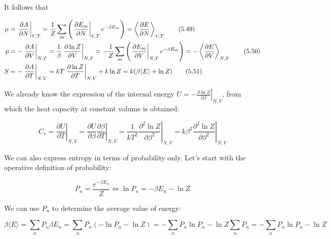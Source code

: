 \documentclass[12pt,a4paper]{report}
\newcommand{\esp}{\vspace{0.5cm}}
\begin{document}
\esp

It follows that

\esp

\begin{align}
	\mu &= \left. \frac{\partial A}{\partial N} \right|_{V,T} = \frac{1}{Z} \sum_{m} \left( \left. \frac{\partial E_m}{\partial N} \right|_{V,T} e^{-\beta E_m} \right) = \left\langle \frac{\partial E}{\partial N} \right\rangle_{V,T} \tag{5.49} \\
	\esp
	p &= -\left. \frac{\partial A}{\partial V} \right|_{N,T} = \frac{1}{\beta} \left. \frac{\partial \ln Z}{\partial V} \right|_{N,T} = -\frac{1}{Z} \sum_{m} \left( \left. \frac{\partial E_m}{\partial V} \right|_{N,T} e^{-\beta E_m} \right) = -\left\langle \frac{\partial E}{\partial V} \right\rangle_{N,T} \tag{5.50} \\
	\esp
	S &= -\left. \frac{\partial A}{\partial T} \right|_{N,V} = kT \left. \frac{\partial \ln Z}{\partial T} \right|_{N,V} + k \ln Z = k(\beta \langle E \rangle + \ln Z) \tag{5.51}
\end{align}

\esp

We already know the expression of the internal energy $U = -\left. \frac{\partial \ln Z}{\partial \beta} \right|_{N,V}$, from which the heat capacity at constant volume is obtained:

\esp

\begin{equation}
	C_v = \left. \frac{\partial U}{\partial T} \right|_{N,V} = \left. \frac{\partial U}{\partial \beta} \frac{\partial \beta}{\partial T} \right|_{N,V} = \frac{1}{kT^2} \left. \frac{\partial^2 \ln Z}{\partial \beta^2} \right|_{N,V} = k \beta^2 \left. \frac{\partial^2 \ln Z}{\partial \beta^2} \right|_{N,V} \tag{5.52}
\end{equation}

\esp

We can also express entropy in terms of probability only. Let's start with the operative definition of probability:

\esp

\begin{equation}
	P_n = \frac{e^{-\beta E_n}}{Z} \iff \ln P_n = -\beta E_n - \ln Z \tag{5.53}
\end{equation}

\esp

We can use $P_n$ to determine the average value of energy:

\esp

\begin{equation}
	\beta \langle E \rangle = \sum_n P_n \beta E_n = \sum_n P_n (-\ln P_n - \ln Z) = -\sum_n P_n \ln P_n - \ln Z \sum_n P_n = -\sum_n P_n \ln P_n - \ln Z \tag{5.54}
\end{equation}
\end{document}
